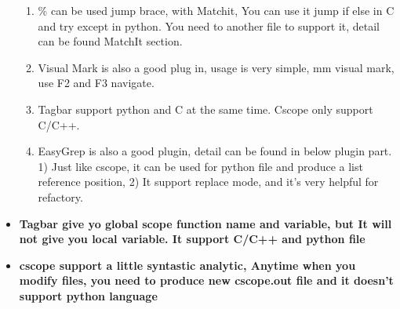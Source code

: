 \documentclass[paper=8.5in:11in, twoside, 12pt, pagesize=pdftex]{book}
\begin{document}
\begin{itemize}
\begin{enumerate}
											\item \% can be used jump brace, with Matchit, You can use it jump if else in C and try except in python. You need to another file to support it, detail can be found MatchIt section. 
											
											\item Visual Mark is also a good plug in, usage is very simple, mm visual mark, use F2 and F3 navigate.
											
											\item Tagbar support python and C at the same time. Cscope only support C/C++.
											
											\item EasyGrep is also a good plugin, detail can be found in below plugin part. 1) Just like cscope, it can be used for python file and produce a list reference position, 2) It support replace mode, and it's very helpful for refactory.
											
										\end{enumerate}
										
										\item \textbf{Tagbar give yo global scope function name and variable, but It will not give you local variable. It support C/C++ and python file}
										
										\item \textbf{cscope support a little syntastic analytic, Anytime when you modify files, you need to produce new cscope.out file and it doesn't support python language}
										
									\end{itemize}
									
									
\end{document}

